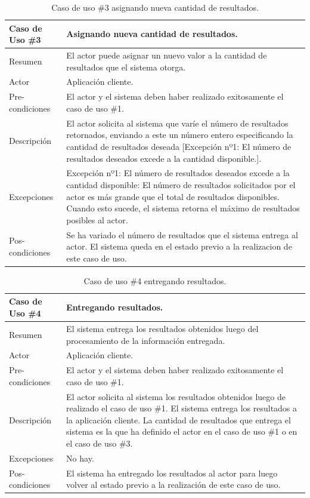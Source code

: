 \begin{table}[H]
\begin{center}
\caption[Caso de uso \#3 asignando nueva cantidad de resultados.]{Caso de uso \#3 asignando nueva cantidad de resultados.}
\label{tab:des-tab03}
\begin{tabular}{|l|>{\raggedright}p{10cm}|}
\hline 
Caso de Uso \#3 & Asignando nueva cantidad de resultados.\tabularnewline
\hline 
\hline 
Resumen & El actor puede asignar un nuevo valor a la cantidad de resultados
que el sistema otorga.\tabularnewline
\hline 
Actor & Aplicación cliente.\tabularnewline
\hline 
Pre-condiciones & El actor y el sistema deben haber realizado exitosamente el caso de
uso \#1.\tabularnewline
\hline 
Descripción & El actor solicita al sistema que varíe el número de resultados retornados,
enviando a este un número entero especificando la cantidad de resultados
deseada {[}Excepción nº1: El número de resultados deseados excede
a la cantidad disponible.{]}.\tabularnewline
\hline 
Excepciones & Excepción nº1: El número de resultados deseados excede a la cantidad
disponible: El número de resultados solicitados por el actor es más
grande que el total de resultados disponibles. Cuando esto sucede,
el sistema retorna el máximo de resultados posibles al actor.\tabularnewline
\hline 
Pos-condiciones & Se ha variado el número de resultados que el sistema entrega al actor.
El sistema queda en el estado previo a la realizacion de este caso
de uso.\tabularnewline
\hline 
\end{tabular}
\end{center}
\end{table}


\begin{table}[H]
\begin{center}
\caption[Caso de uso \#4 entregando resultados.]{Caso de uso \#4 entregando resultados.}
\label{tab:des-tab04}
\begin{tabular}{|l|>{\raggedright}p{10cm}|}
\hline 
Caso de Uso \#4 & Entregando resultados.\tabularnewline
\hline 
\hline 
Resumen & El sistema entrega los resultados obtenidos luego del procesamiento
de la información entregada.\tabularnewline
\hline 
Actor & Aplicación cliente.\tabularnewline
\hline 
Pre-condiciones & El actor y el sistema deben haber realizado exitosamente el caso de
uso \#1.\tabularnewline
\hline 
Descripción & El actor solicita al sistema los resultados obtenidos luego de realizado
el caso de uso \#1. El sistema entrega los resultados a la aplicación
cliente. La cantidad de resultados que entrega el sistema es la que
ha definido el actor en el caso de uso \#1 o en el caso de uso \#3. \tabularnewline
\hline 
Excepciones & No hay.\tabularnewline
\hline 
Pos-condiciones & El sistema ha entregado los resultados al actor para luego volver
al estado previo a la realización de este caso de uso. \tabularnewline
\hline 
\end{tabular}
\end{center}
\end{table}


